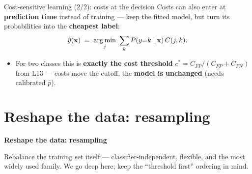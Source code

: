 \documentclass[aspectratio=169]{beamer}
\begin{document}
\begin{frame}{Cost-sensitive learning (2/2): costs at the decision}
  Costs can also enter at \textbf{prediction time} instead of training --- keep the fitted model,
  but turn its probabilities into the \textbf{cheapest label}:
  \[ \hat y(\mathbf{x}) \;=\; \mathop{\mathrm{arg\,min}}_{j}\ \sum_{k} P(y{=}k \mid \mathbf{x})\, C(j,k). \]
  \vfill
  \begin{itemize}\small
    \item For two classes this is \textbf{exactly the cost threshold} $c^* = C_{FP}/(C_{FP}+C_{FN})$
      from L13 --- costs move the cutoff, the \textbf{model is unchanged} (needs calibrated $\hat p$).
  \end{itemize}
  \vfill
\end{frame}

\section{Reshape the data: resampling}

\begin{frame}[plain]
  \vfill
  \begin{center}
    {\Large\color{popblue}\textbf{Reshape the data: resampling}}\\[0.9em]
    \begin{minipage}{0.82\textwidth}\centering\small
      Rebalance the training set itself --- classifier-independent, flexible, and the most
      widely used family. We go deep here; keep the ``threshold first'' ordering in mind.
    \end{minipage}
  \end{center}
  \vfill
\end{frame}
\end{document}
